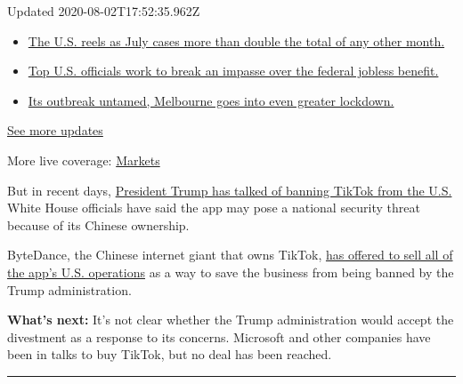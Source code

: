 Updated 2020-08-02T17:52:35.962Z

\begin{itemize}
\tightlist
\item
  \href{https://www.nytimes.com/2020/08/01/world/coronavirus-covid-19.html?action=click\&pgtype=Article\&state=default\&region=MAIN_CONTENT_1\&context=storylines_live_updates\#link-34047410}{The
  U.S. reels as July cases more than double the total of any other
  month.}
\item
  \href{https://www.nytimes.com/2020/08/01/world/coronavirus-covid-19.html?action=click\&pgtype=Article\&state=default\&region=MAIN_CONTENT_1\&context=storylines_live_updates\#link-780ec966}{Top
  U.S. officials work to break an impasse over the federal jobless
  benefit.}
\item
  \href{https://www.nytimes.com/2020/08/01/world/coronavirus-covid-19.html?action=click\&pgtype=Article\&state=default\&region=MAIN_CONTENT_1\&context=storylines_live_updates\#link-2bc8948}{Its
  outbreak untamed, Melbourne goes into even greater lockdown.}
\end{itemize}

\href{https://www.nytimes.com/2020/08/01/world/coronavirus-covid-19.html?action=click\&pgtype=Article\&state=default\&region=MAIN_CONTENT_1\&context=storylines_live_updates}{See
more updates}

More live coverage:
\href{https://www.nytimes.com/live/2020/07/31/business/stock-market-today-coronavirus?action=click\&pgtype=Article\&state=default\&region=MAIN_CONTENT_1\&context=storylines_live_updates}{Markets}

But in recent days,
\href{https://www.nytimes.com/2020/08/01/technology/tiktok-trump-microsoft-bytedance-china-ban.html}{President
Trump has talked of banning TikTok from the U.S.} White House officials
have said the app may pose a national security threat because of its
Chinese ownership.

ByteDance, the Chinese internet giant that owns TikTok,
\href{https://www.nytimes.com/2020/08/01/technology/tiktok-sale-trump-ban.html}{has
offered to sell all of the app's U.S. operations} as a way to save the
business from being banned by the Trump administration.

\textbf{What's next:} It's not clear whether the Trump administration
would accept the divestment as a response to its concerns. Microsoft and
other companies have been in talks to buy TikTok, but no deal has been
reached.

\begin{center}\rule{0.5\linewidth}{\linethickness}\end{center}

